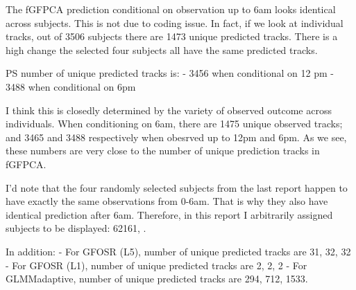 \documentclass[
]{article}
\newenvironment{Shaded}{\begin{snugshade}}{\end{snugshade}}
\newcommand{\AttributeTok}[1]{\textcolor[rgb]{0.13,0.29,0.53}{#1}}
\newcommand{\CommentTok}[1]{\textcolor[rgb]{0.56,0.35,0.01}{\textit{#1}}}
\newcommand{\DecValTok}[1]{\textcolor[rgb]{0.00,0.00,0.81}{#1}}
\newcommand{\FunctionTok}[1]{\textcolor[rgb]{0.13,0.29,0.53}{\textbf{#1}}}
\newcommand{\NormalTok}[1]{#1}
\newcommand{\SpecialCharTok}[1]{\textcolor[rgb]{0.81,0.36,0.00}{\textbf{#1}}}
\newcommand{\StringTok}[1]{\textcolor[rgb]{0.31,0.60,0.02}{#1}}
\begin{document}
The fGFPCA prediction conditional on observation up to 6am looks
identical across subjects. This is not due to coding issue. In fact, if
we look at individual tracks, out of 3506 subjects there are 1473 unique
predicted tracks. There is a high change the selected four subjects all
have the same predicted tracks.

PS number of unique predicted tracks is: - 3456 when conditional on 12
pm - 3488 when conditional on 6pm

I think this is closedly determined by the variety of observed outcome
across individuals. When conditioning on 6am, there are 1475 unique
observed tracks; and 3465 and 3488 respectively when obesrved up to 12pm
and 6pm. As we see, these numbers are very close to the number of unique
prediction tracks in fGFPCA.

I'd note that the four randomly selected subjects from the last report
happen to have exactly the same observations from 0-6am. That is why
they also have identical prediction after 6am. Therefore, in this report
I arbitrarily assigned subjects to be displayed: 62161, .

In addition: - For GFOSR (L5), number of unique predicted tracks are 31,
32, 32 - For GFOSR (L1), number of unique predicted tracks are 2, 2, 2 -
For GLMMadaptive, number of unique predicted tracks are 294, 712, 1533.

\begin{Shaded}
\end{Shaded}
\end{document}
